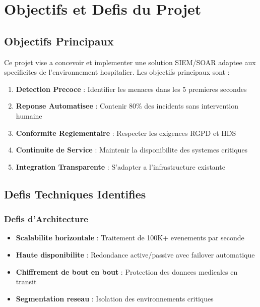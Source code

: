 \section{Objectifs et Defis du Projet}

\subsection{Objectifs Principaux}

Ce projet vise a concevoir et implementer une solution SIEM/SOAR adaptee aux specificites de l'environnement hospitalier. Les objectifs principaux sont :

\begin{enumerate}
    \item \textbf{Detection Precoce} : Identifier les menaces dans les 5 premieres secondes
    \item \textbf{Reponse Automatisee} : Contenir 80\% des incidents sans intervention humaine
    \item \textbf{Conformite Reglementaire} : Respecter les exigences RGPD et HDS
    \item \textbf{Continuite de Service} : Maintenir la disponibilite des systemes critiques
    \item \textbf{Integration Transparente} : S'adapter a l'infrastructure existante
\end{enumerate}

\subsection{Defis Techniques Identifies}

\subsubsection{Defis d'Architecture}

\begin{itemize}
    \item \textbf{Scalabilite horizontale} : Traitement de 100K+ evenements par seconde
    \item \textbf{Haute disponibilite} : Redondance active/passive avec failover automatique
    \item \textbf{Chiffrement de bout en bout} : Protection des donnees medicales en transit
    \item \textbf{Segmentation reseau} : Isolation des environnements critiques
\end{itemize}

